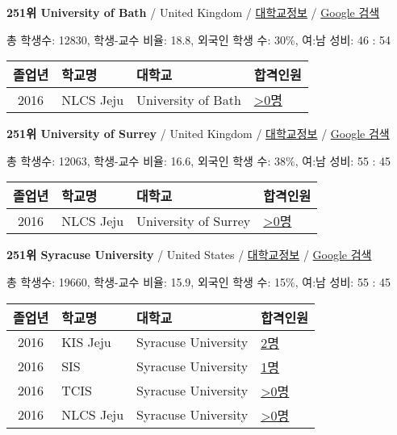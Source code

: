 \documentclass[13pt,]{article}
\begin{document}
\textbf{251위 University of Bath} / United Kingdom /
\href{https://www.timeshighereducation.com/world-university-rankings/university-of-bath?ranking-dataset=589595}{대학교정보}
/ \href{http://www.google.com/search?q=University+of+Bath}{Google 검색}

총 학생수: 12830, 학생-교수 비율: 18.8, 외국인 학생 수: 30\%, 여:남
성비: 46 : 54

\begin{longtable}[]{@{}clll@{}}
\toprule
졸업년 & 학교명 & 대학교 & 합격인원\tabularnewline
\midrule
\endhead
2016 & NLCS Jeju & University of Bath &
\href{http://cafe.naver.com/assarabia/11592}{\textgreater{}0명}\tabularnewline
\bottomrule
\end{longtable}

\textbf{251위 University of Surrey} / United Kingdom /
\href{https://www.timeshighereducation.com/world-university-rankings/university-of-surrey?ranking-dataset=589595}{대학교정보}
/ \href{http://www.google.com/search?q=University+of+Surrey}{Google
검색}

총 학생수: 12063, 학생-교수 비율: 16.6, 외국인 학생 수: 38\%, 여:남
성비: 55 : 45

\begin{longtable}[]{@{}clll@{}}
\toprule
졸업년 & 학교명 & 대학교 & 합격인원\tabularnewline
\midrule
\endhead
2016 & NLCS Jeju & University of Surrey &
\href{http://cafe.naver.com/assarabia/11592}{\textgreater{}0명}\tabularnewline
\bottomrule
\end{longtable}

\textbf{251위 Syracuse University} / United States /
\href{https://www.timeshighereducation.com/world-university-rankings/syracuse-university?ranking-dataset=589595}{대학교정보}
/ \href{http://www.google.com/search?q=Syracuse+University}{Google 검색}

총 학생수: 19660, 학생-교수 비율: 15.9, 외국인 학생 수: 15\%, 여:남
성비: 55 : 45

\begin{longtable}[]{@{}clll@{}}
\toprule
졸업년 & 학교명 & 대학교 & 합격인원\tabularnewline
\midrule
\endhead
2016 & KIS Jeju & Syracuse University &
\href{http://cafe.naver.com/assarabia/11596}{2명}\tabularnewline
2016 & SIS & Syracuse University &
\href{http://cafe.naver.com/assarabia/11589}{1명}\tabularnewline
2016 & TCIS & Syracuse University &
\href{http://cafe.naver.com/assarabia/11598}{\textgreater{}0명}\tabularnewline
2016 & NLCS Jeju & Syracuse University &
\href{http://cafe.naver.com/assarabia/11592}{\textgreater{}0명}\tabularnewline
\bottomrule
\end{longtable}
\end{document}
